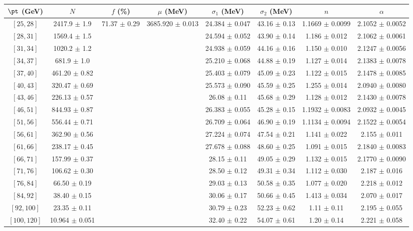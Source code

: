 \begin{tabular}{c||c|c|c|c|c|c|c}
$\pt$ (GeV) & $N$ & $f$ (\%) & $\mu$ (MeV) & $\sigma_1$ (MeV) & $\sigma_2$ (MeV) & $n$ & $\alpha$ \\
\hline
$[25, 28]$ & 2417.9 $\pm$ 1.9 & \multirow{17}{*}{71.37 $\pm$ 0.29} & \multirow{17}{*}{3685.920 $\pm$ 0.013} & 24.384 $\pm$ 0.047 & 43.16 $\pm$ 0.13 & 1.1669 $\pm$ 0.0099 & 2.1052 $\pm$ 0.0052\\
$[28, 31]$ & 1569.4 $\pm$ 1.5 &  &  & 24.594 $\pm$ 0.052 & 43.90 $\pm$ 0.14 & 1.186 $\pm$ 0.012 & 2.1062 $\pm$ 0.0061\\
$[31, 34]$ & 1020.2 $\pm$ 1.2 &  &  & 24.938 $\pm$ 0.059 & 44.16 $\pm$ 0.16 & 1.150 $\pm$ 0.010 & 2.1247 $\pm$ 0.0056\\
$[34, 37]$ & 681.9 $\pm$ 1.0 &  &  & 25.210 $\pm$ 0.068 & 44.88 $\pm$ 0.19 & 1.127 $\pm$ 0.014 & 2.1383 $\pm$ 0.0078\\
$[37, 40]$ & 461.20 $\pm$ 0.82 &  &  & 25.403 $\pm$ 0.079 & 45.09 $\pm$ 0.23 & 1.122 $\pm$ 0.015 & 2.1478 $\pm$ 0.0085\\
$[40, 43]$ & 320.47 $\pm$ 0.69 &  &  & 25.573 $\pm$ 0.090 & 45.59 $\pm$ 0.25 & 1.255 $\pm$ 0.014 & 2.0940 $\pm$ 0.0080\\
$[43, 46]$ & 226.13 $\pm$ 0.57 &  &  & 26.08 $\pm$ 0.11 & 45.68 $\pm$ 0.29 & 1.128 $\pm$ 0.012 & 2.1430 $\pm$ 0.0078\\
$[46, 51]$ & 844.93 $\pm$ 0.87 &  &  & 26.383 $\pm$ 0.055 & 45.28 $\pm$ 0.15 & 1.1932 $\pm$ 0.0083 & 2.0932 $\pm$ 0.0045\\
$[51, 56]$ & 556.44 $\pm$ 0.71 &  &  & 26.709 $\pm$ 0.064 & 46.90 $\pm$ 0.19 & 1.1134 $\pm$ 0.0094 & 2.1522 $\pm$ 0.0054\\
$[56, 61]$ & 362.90 $\pm$ 0.56 &  &  & 27.224 $\pm$ 0.074 & 47.54 $\pm$ 0.21 & 1.141 $\pm$ 0.022 & 2.155 $\pm$ 0.011\\
$[61, 66]$ & 238.17 $\pm$ 0.45 &  &  & 27.678 $\pm$ 0.088 & 48.60 $\pm$ 0.25 & 1.091 $\pm$ 0.015 & 2.1840 $\pm$ 0.0083\\
$[66, 71]$ & 157.99 $\pm$ 0.37 &  &  & 28.15 $\pm$ 0.11 & 49.05 $\pm$ 0.29 & 1.132 $\pm$ 0.015 & 2.1770 $\pm$ 0.0090\\
$[71, 76]$ & 106.62 $\pm$ 0.30 &  &  & 28.50 $\pm$ 0.12 & 49.31 $\pm$ 0.34 & 1.112 $\pm$ 0.030 & 2.187 $\pm$ 0.016\\
$[76, 84]$ & 66.50 $\pm$ 0.19 &  &  & 29.03 $\pm$ 0.13 & 50.58 $\pm$ 0.35 & 1.077 $\pm$ 0.020 & 2.218 $\pm$ 0.012\\
$[84, 92]$ & 38.40 $\pm$ 0.15 &  &  & 30.06 $\pm$ 0.17 & 50.66 $\pm$ 0.45 & 1.413 $\pm$ 0.034 & 2.070 $\pm$ 0.017\\
$[92, 100]$ & 23.35 $\pm$ 0.11 &  &  & 30.79 $\pm$ 0.23 & 52.23 $\pm$ 0.62 & 1.11 $\pm$ 0.11 & 2.195 $\pm$ 0.055\\
$[100, 120]$ & 10.964 $\pm$ 0.051 &  &  & 32.40 $\pm$ 0.22 & 54.07 $\pm$ 0.61 & 1.20 $\pm$ 0.14 & 2.221 $\pm$ 0.058\\
\end{tabular}
